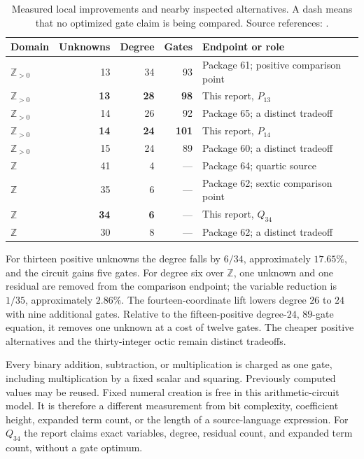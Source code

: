 \documentclass[11pt,a4paper]{article}
\theoremstyle{definition}
\newcommand{\Z}{\mathbb Z}
\newcommand{\Zpos}{\mathbb Z_{>0}}
\begin{document}
\begin{table}[htbp]
\centering
\small
\begin{tabularx}{\textwidth}{@{}lrrrX@{}}
\toprule
Domain & Unknowns & Degree & Gates & Endpoint or role\\
\midrule
\(\Zpos\) & 13 & 34 & 93 & Package 61; positive comparison point\\
\(\Zpos\) & \textbf{13} & \textbf{28} & \textbf{98}
 & This report, \(P_{13}\)\\
\(\Zpos\) & 14 & 26 & 92 & Package 65; a distinct tradeoff\\
\(\Zpos\) & \textbf{14} & \textbf{24} & \textbf{101}
 & This report, \(P_{14}\)\\
\(\Zpos\) & 15 & 24 & 89 & Package 60; a distinct tradeoff\\
\addlinespace
\(\Z\) & 41 & 4 & --- & Package 64; quartic source\\
\(\Z\) & 35 & 6 & --- & Package 62; sextic comparison point\\
\(\Z\) & \textbf{34} & \textbf{6} & --- & This report, \(Q_{34}\)\\
\(\Z\) & 30 & 8 & --- & Package 62; a distinct tradeoff\\
\bottomrule
\end{tabularx}
\caption{Measured local improvements and nearby inspected alternatives.
A dash means that no optimized gate claim is being compared.  Source
references: \cite{source61,source62,source64,source65,source60}.}
\label{tab:comparison}
\end{table}

For thirteen positive unknowns the degree falls by \(6/34\), approximately
\(17.65\%\), and the circuit gains five gates.  For degree six over
\(\Z\), one unknown and one residual are removed from the comparison
endpoint; the variable reduction is \(1/35\), approximately \(2.86\%\).
The fourteen-coordinate lift lowers degree \(26\) to \(24\) with nine
additional gates.  Relative to the fifteen-positive degree-\(24\),
\(89\)-gate equation, it removes one unknown at a cost of twelve gates.
The cheaper positive alternatives and the thirty-integer octic remain
distinct tradeoffs.

Every binary addition, subtraction, or multiplication is charged as one
gate, including multiplication by a fixed scalar and squaring.
Previously computed values may be reused.  Fixed numeral creation is
free in this arithmetic-circuit model.  It is therefore a different
measurement from bit complexity, coefficient height, expanded term
count, or the length of a source-language expression.
For \(Q_{34}\) the report claims exact variables, degree, residual count,
and expanded term count, without a gate optimum.
\end{document}
